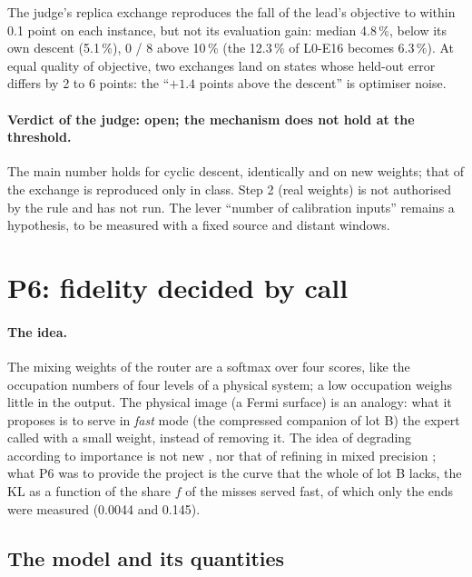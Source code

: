 The judge's replica exchange reproduces the fall of the lead's objective to within 0.1 point on each instance, but not its evaluation gain: median 4.8\,\%, below its own descent (5.1\,\%), 0 / 8 above 10\,\% (the 12.3\,\% of L0-E16 becomes 6.3\,\%). At equal quality of objective, two exchanges land on states whose held-out error differs by 2 to 6 points: the ``$+1.4$ points above the descent'' is optimiser noise.

\paragraph{Verdict of the judge: open; the mechanism does not hold at the threshold.} The main number holds for cyclic descent, identically and on new weights; that of the exchange is reproduced only in class. Step 2 (real weights) is not authorised by the rule and has not run. The lever ``number of calibration inputs'' remains a hypothesis, to be measured with a fixed source and distant windows.

\section{P6: fidelity decided by call}\label{t3mim:sec:p6}

\paragraph{The idea.} The mixing weights of the router are a softmax over four scores, like the occupation numbers of four levels of a physical system; a low occupation weighs little in the output. The physical image (a Fermi surface) is an analogy: what it proposes is to serve in \emph{fast} mode (the compressed companion of lot B) the expert called with a small weight, instead of removing it. The idea of degrading according to importance is not new \cite{hobbit2024,lu2024notallexperts}, nor that of refining in mixed precision \cite{haidar2018mixed}; what P6 was to provide the project is the curve that the whole of lot B lacks, the KL as a function of the share $f$ of the misses served fast, of which only the ends were measured (0.0044 and 0.145).

\subsection{The model and its quantities}\label{t3mim:sec:p6-modele}

